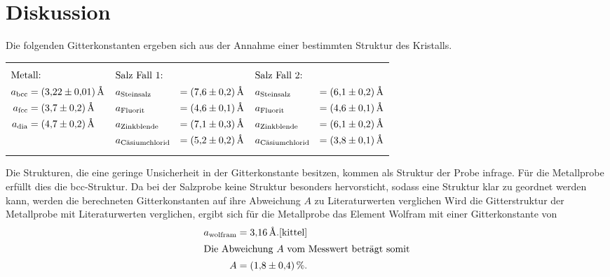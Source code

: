 \section{Diskussion}
\label{sec:Diskussion}
Die folgenden Gitterkonstanten ergeben sich aus der Annahme einer
bestimmten Struktur des Kristalls.
\begin{table}
  \centering
\begin{tabular}{p{} p{} p{} }
{\begin{align*}
\intertext{Metall:}
a_{\mathrm{bcc}}&=\SI{3.22(1)}{\angstrom}\\
a_{\mathrm{fcc}}&=\SI{3.7(2)}{\angstrom}\\
a_{\mathrm{dia}}&=\SI{4.7(2)}{\angstrom}
\end{align*}}
&
{\begin{align*}
\intertext{Salz Fall 1:}
&a_{\text{Steinsalz}}&=\SI{7.6(2)}{\angstrom}\\
&a_{\text{Fluorit}}&=\SI{4.6(1)}{\angstrom}\\
&a_{\text{Zinkblende}}&=\SI{7.1(3)}{\angstrom}\\
&a_{\text{Cäsiumchlorid}} &=\SI{5.2(2)}{\angstrom}
\end{align*}}
&
{\begin{align*}
\intertext{Salz Fall 2:}
&a_{\text{Steinsalz}}&=\SI{6.1(2)}{\angstrom}\\
&a_{\text{Fluorit}}&=\SI{4.6(1)}{\angstrom}\\
&a_{\text{Zinkblende}}&=\SI{6.1(2)}{\angstrom}\\
&a_{\text{Cäsiumchlorid}} &=\SI{3.8(1)}{\angstrom}
\end{align*}}
\end{tabular}
\end{table}
Die Strukturen, die eine geringe Unsicherheit in der Gitterkonstante besitzen,
kommen als Struktur der Probe infrage.
Für die Metallprobe erfüllt dies die bcc-Struktur.
Da bei der Salzprobe keine Struktur besonders hervorsticht, sodass
eine Struktur klar zu geordnet werden kann, werden die berechneten
Gitterkonstanten auf ihre Abweichung $A$ zu Literaturwerten verglichen
Wird die Gitterstruktur der Metallprobe mit Literaturwerten
verglichen, ergibt sich für die Metallprobe das Element
Wolfram mit einer Gitterkonstante von
\begin{align*}
a_{\text{wolfram}}=\SI{3.16}{\angstrom}.\text{\cite{kittel}} \\
\intertext{Die Abweichung $A$ vom Messwert beträgt somit}
A=\SI{1.8(4)}{\percent}.
\end{align*}
